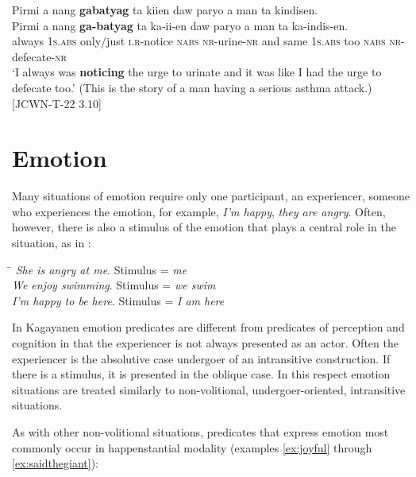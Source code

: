 \ea
\label{ex:asthmaattack}
Pirmi  a  nang  \textbf{gabatyag}  ta  kiien  daw  paryo a  man  ta  kindisen. \\\smallskip
\gll Pirmi  a  nang  \textbf{ga-batyag}  ta  ka-ii-en  daw  paryo a  man  ta  ka-indis-en. \\
always  1\textsc{s.abs}  only/just  \textsc{i.r}-notice  \textsc{nabs}  \textsc{nr}-urine-\textsc{nr}  and  same 1\textsc{s.abs}  too  \textsc{nabs}  \textsc{nr}-defecate-\textsc{nr} \\
\glt `I always was \textbf{noticing} the urge to urinate and it was like I had the urge to defecate too.’ (This is the story of a man having a serious asthma attack.) [JCWN-T-22 3.10]
\z


\section{Emotion}
\label{sec:emotion}

Many situations of emotion require only one participant, an experiencer, someone who experiences the emotion, for example, \textit{I’m happy}, \textit{they are angry}. Often, however, there is also a stimulus of the emotion that plays a central role in the situation, as in :

\ea
\label{ex:weswim}
\begin{tabbing}
\hspace{3.5cm} \= \kill 
\textit{She is angry at me}. \> Stimulus = \textit{me} \\
\textit{We enjoy swimming}. \> Stimulus = \textit{we swim} \\
\textit{I’m happy to be here}. \> Stimulus = \textit{I am here}
\end{tabbing}
\z

In Kagayanen emotion predicates are different from predicates of perception and cognition in that the experiencer is not always presented as an actor. Often the experiencer is the absolutive case undergoer of an intransitive construction. If there is a stimulus, it is presented in the oblique case. In this respect emotion situations are treated similarly to non-volitional, undergoer-oriented, intransitive situations.

As with other non-volitional situations, predicates that express emotion most commonly occur in  happenstantial modality (examples \ref{ex:joyful} through \ref{ex:saidthegiant}):

